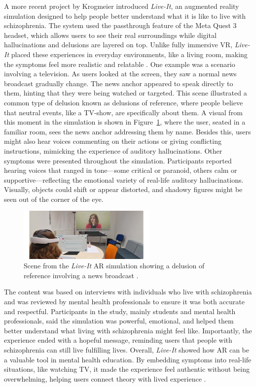 \vspace{1em}

A more recent project by Krogmeier \cite{Krogmeier2024} introduced \textit{Live-It}, an augmented reality  simulation designed to help people better understand what it is like to live with schizophrenia. The system used the passthrough feature of the Meta Quest 3 headset, which allows users to see their real surroundings while digital hallucinations and delusions are layered on top. Unlike fully immersive VR, \textit{Live-It} placed these experiences in everyday environments, like a living room, making the symptoms feel more realistic and relatable \cite{Krogmeier2024}. One example was a scenario involving a television. As users looked at the screen, they saw a normal news broadcast gradually change. The news anchor appeared to speak directly to them, hinting that they were being watched or targeted. This scene illustrated a common type of delusion known as delusions of reference, where people believe that neutral events, like a TV-show, are specifically about them.  A visual from this moment in the simulation is shown in Figure~\ref{fig:liveit_tv}, where the user, seated in a familiar room, sees the news anchor addressing them by name. Besides this, users might also hear voices commenting on their actions or giving conflicting instructions, mimicking the experience of auditory hallucinations. Other symptoms were presented throughout the simulation. Participants reported hearing voices that ranged in tone—some critical or paranoid, others calm or supportive—reflecting the emotional variety of real-life auditory hallucinations. Visually, objects could shift or appear distorted, and shadowy figures might be seen out of the corner of the eye. 

\begin{figure}[H]
  \centering
  \includegraphics[width=0.6\textwidth]{../../Figures/live-it.jpeg}
  \caption{Scene from the \textit{Live-It} AR simulation showing a delusion of reference involving a news broadcast \cite{Krogmeier2024}.}
  \label{fig:liveit_tv}
\end{figure}

The content was based on interviews with individuals who live with schizophrenia and was reviewed by mental health professionals to ensure it was both accurate and respectful. Participants in the study, mainly students and mental health professionals, said the simulation was powerful, emotional, and helped them better understand what living with schizophrenia might feel like. Importantly, the experience ended with a hopeful message, reminding users that people with schizophrenia can still live fulfilling lives. Overall, \textit{Live-It} showed how AR can be a valuable tool in mental health education. By embedding symptoms into real-life situations, like watching TV, it made the experience feel authentic without being overwhelming, helping users connect theory with lived experience \cite{Krogmeier2024}.


